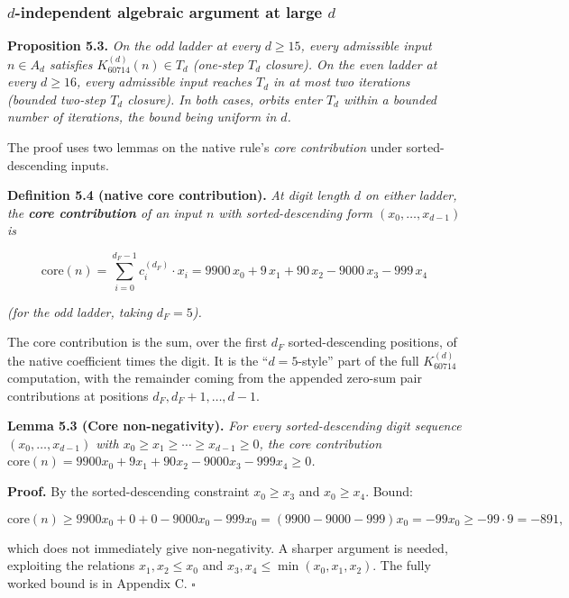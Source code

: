 \documentclass[11pt,letterpaper]{article}
\theoremstyle{paperstyle}
\theoremstyle{paperstyledef}
\theoremstyle{paperstylerem}
\begin{document}
\hypertarget{d-independent-algebraic-argument-at-large-d}{%
\subsubsection{\texorpdfstring{\(d\)-independent algebraic argument at large \(d\)}{d-independent algebraic argument at large d}}\label{d-independent-algebraic-argument-at-large-d}}

\textbf{Proposition 5.3.} \emph{On the odd ladder at every
\(d \geq 15\), every admissible input \(n \in A_d\) satisfies
\(K_{60714}^{(d)}(n) \in T_d\) (one-step \(T_d\) closure). On the even
ladder at every \(d \geq 16\), every admissible input reaches \(T_d\) in
at most two iterations (bounded two-step \(T_d\) closure). In both
cases, orbits enter \(T_d\) within a bounded number of iterations, the
bound being uniform in \(d\).}

The proof uses two lemmas on the native rule's \emph{core contribution}
under sorted-descending inputs.

\textbf{Definition 5.4 (native core contribution).} \emph{At digit
length \(d\) on either ladder, the \textbf{core contribution} of an
input \(n\) with sorted-descending form \((x_0, \ldots, x_{d-1})\) is}

\[\mathrm{core}(n) = \sum_{i = 0}^{d_{F} - 1} c_i^{(d_{F})} \cdot x_i = 9900 \, x_0 + 9 \, x_1 + 90 \, x_2 - 9000 \, x_3 - 999 \, x_4\]

\emph{(for the odd ladder, taking \(d_F = 5\)).}

The core contribution is the sum, over the first \(d_F\)
sorted-descending positions, of the native coefficient times the digit.
It is the ``\(d = 5\)-style'' part of the full \(K_{60714}^{(d)}\)
computation, with the remainder coming from the appended zero-sum pair
contributions at positions \(d_F, d_F + 1, \ldots, d - 1\).

\textbf{Lemma 5.3 (Core non-negativity).} \emph{For every
sorted-descending digit sequence \((x_0, \ldots, x_{d-1})\) with
\(x_0 \geq x_1 \geq \cdots \geq x_{d-1} \geq 0\), the core contribution
\(\mathrm{core}(n) = 9900 x_0 + 9 x_1 + 90 x_2 - 9000 x_3 - 999 x_4 \geq 0\).}

\textbf{Proof.} By the sorted-descending constraint \(x_0 \geq x_3\) and
\(x_0 \geq x_4\). Bound:

\[\mathrm{core}(n) \geq 9900 x_0 + 0 + 0 - 9000 x_0 - 999 x_0 = (9900 - 9000 - 999) x_0 = -99 x_0 \geq -99 \cdot 9 = -891,\]

which does not immediately give non-negativity. A sharper argument is
needed, exploiting the relations \(x_1, x_2 \leq x_0\) and
\(x_3, x_4 \leq \min(x_0, x_1, x_2)\). The fully worked bound is in
Appendix C. \(\square\)
\end{document}
